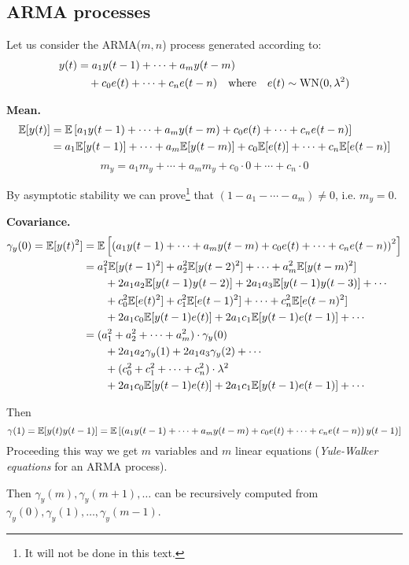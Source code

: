 \subsection{ARMA processes}
Let us consider the ARMA($m,n$) process generated according to:
\begin{align*}
	y(t) & = a_{1} y(t-1)+\cdots+a_{m} y(t-m)\\
	     &\quad +c_{0} e(t)+\cdots+c_{n} e(t-n) \quad \text{where} \quad e(t) \sim \operatorname{WN}(0, \lambda^{2})
\end{align*}


\textbf{Mean.}
\begin{align*}
	\mathbb{E}[y(t)] &=\mathbb{E}\left[a_{1} y(t-1)+\cdots+a_{m} y(t-m)+c_{0} e(t)+\cdots+c_{n} e(t-n)\right] \\
	&=a_{1} \mathbb{E}[y(t-1)]+\cdots+a_{m} \mathbb{E}[y(t-m)]+c_{0} \mathbb{E}[e(t)]+\cdots+c_{n} \mathbb{E}[e(t-n)]
\end{align*}
$$
m_{y}=a_{1} m_{y}+\cdots+a_{m} m_{y}+c_{0} \cdot 0+\cdots+c_{n} \cdot 0
$$

By asymptotic stability we can prove\footnote{It will not be done in this text.} that $(1-a_1-\cdots-a_m)\neq 0$, i.e. $m_{y}=0$.

\textbf{Covariance.}
\begin{align*}
	\gamma_{y}(0) = \mathbb{E}[y(t)^{2}] &= \mathbb{E}\left[\left(a_{1} y(t-1) + \cdots + a_{m} y(t-m) + c_{0} e(t) + \cdots + c_{n} e(t-n)\right)^{2}\right]\\
	&= a_{1}^{2} \mathbb{E}[y(t-1)^{2}] + a_{2}^{2} \mathbb{E}[y(t-2)^{2}] + \cdots+a_{m}^{2} \mathbb{E}[y(t-m)^{2}]\\
	&\qquad + 2 a_{1} a_{2} \mathbb{E}[y(t-1) y(t-2)] + 2 a_{1} a_{3} \mathbb{E}[y(t-1) y(t-3)] + \cdots \\
	&\qquad + c_{0}^{2} \mathbb{E}[e(t)^{2}] + c_{1}^2 \mathbb{E}[e(t-1)^2] + \cdots+c_{n}^2 \mathbb{E}[e(t-n)^2]\\
	&\qquad + 2 a_{1} c_{0} \mathbb{E}[y(t-1) e(t)] + 2 a_{1} c_{1} \mathbb{E}[y(t-1) e(t-1)] + \cdots\\
	&= (a_{1}^{2} + a_{2}^{2} + \cdots+a_{m}^{2})\cdot\gamma_{y}(0)\\
	&\qquad + 2 a_{1} a_{2} \gamma_{y}(1) + 2 a_{1} a_{3} \gamma_{y}(2) + \cdots \\
	&\qquad + (c_{0}^{2} + c_{1}^2 + \cdots+c_{n}^2)\cdot\lambda^2\\
	&\qquad + 2 a_{1} c_{0} \mathbb{E}[y(t-1) e(t)] + 2 a_{1} c_{1} \mathbb{E}[y(t-1) e(t-1)] + \cdots\\
\end{align*}

Then
\[
	\gamma (1)=\mathbb{E}[y(t) y(t-1)] = \mathbb{E}\left[\left(a_{1} y(t-1)+\cdots+a_{m} y(t-m)+c_{0} e(t)+\cdots+c_{n} e(t-n)\right) y(t-1)\right]
\]
Proceeding this way we get $m$ variables and $m$ linear equations (\emph{Yule-Walker equations} for an ARMA process).

Then $\gamma_{y}(m), \gamma_{y}(m+1), \ldots$ can be recursively computed from $\gamma_{y}(0), \gamma_{y}(1), \ldots, \gamma_{y}(m-1)$.